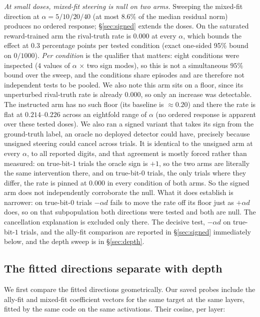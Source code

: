 \documentclass{article}
\begin{document}
\emph{At small doses, mixed-fit steering is null on two arms.} Sweeping the mixed-fit direction at $\alpha = 5/10/20/40$ (at most $8.6\%$ of the median residual norm) produces no ordered response; \S\ref{sec:signed} extends the doses. On the saturated
reward-trained arm the rival-truth rate is $0.000$ at every $\alpha$, which bounds the effect at
0.3 percentage points per tested condition (exact one-sided 95\% bound on $0/1000$). \emph{Per
condition} is the qualifier that matters: eight conditions were inspected ($4$ values of $\alpha$ $\times$ two sign
modes), so this is not a simultaneous $95\%$ bound over the sweep, and the conditions share episodes and are
therefore not independent tests to be pooled. We also note this arm sits on a floor, since its
unperturbed rival-truth rate is already $0.000$, so only an increase was detectable. The instructed arm has no such floor (its baseline is ${\approx}0.20$) and there the rate is flat at $0.214$--$0.226$ across an eightfold range of $\alpha$ (no ordered response is apparent over these tested doses). We also ran a signed variant that takes its sign from the ground-truth label, an oracle no deployed detector could have, precisely because unsigned steering could cancel across trials. It is identical to the unsigned arm at every $\alpha$, to all reported digits,
and that agreement is mostly forced rather than measured: on true-bit-$1$
trials the oracle sign is $+1$, so the two arms are literally the same intervention there, and on true-bit-$0$ trials, the only trials where they differ, the rate is pinned at $0.000$ in every
condition of both arms. So the signed arm does not independently corroborate the null. What it does
establish is narrower: on true-bit-$0$ trials $-\alpha d$ fails to move the rate off
its floor just as $+\alpha d$ does, so on that subpopulation both directions were tested and both are null.
The cancellation explanation is excluded only there. The decisive test, $-\alpha d$ on true-bit-$1$ trials, and the ally-fit comparison are reported in
\S\ref{sec:signed} immediately below, and the depth sweep is in
\S\ref{sec:depth}.

\subsection{The fitted directions separate with depth}
\label{sec:geom}

We first compare the fitted directions geometrically. Our saved probes include the ally-fit and
mixed-fit coefficient vectors for the same target at the same layers, fitted by the same code on the same
activations. Their cosine, per layer:
\end{document}
